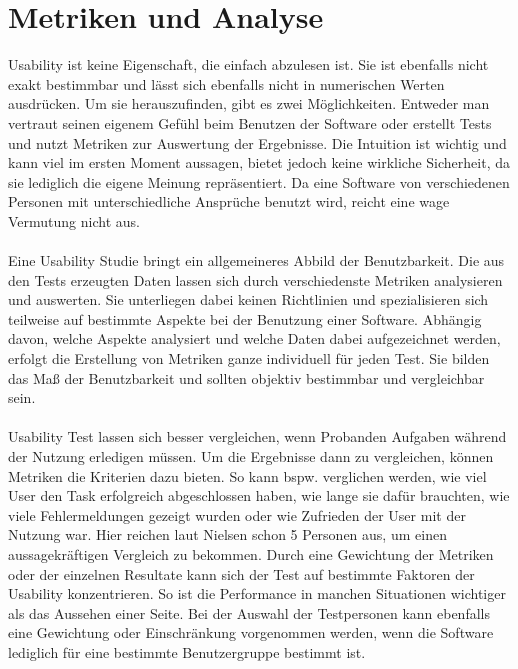 %
%
%
%


\section{Metriken und Analyse}

Usability ist keine Eigenschaft, die einfach abzulesen ist. Sie ist ebenfalls nicht exakt bestimmbar und lässt sich ebenfalls nicht in numerischen Werten ausdrücken. Um sie herauszufinden, gibt es zwei Möglichkeiten. Entweder man vertraut seinen eigenem Gefühl beim Benutzen der Software oder erstellt Tests und nutzt Metriken zur Auswertung der Ergebnisse. Die Intuition ist wichtig und kann viel im ersten Moment aussagen, bietet jedoch keine wirkliche Sicherheit, da sie lediglich die eigene Meinung repräsentiert. Da eine Software von verschiedenen Personen mit unterschiedliche Ansprüche benutzt wird, reicht eine wage Vermutung nicht aus.\\
\\
Eine Usability Studie bringt ein allgemeineres Abbild der Benutzbarkeit. Die aus den Tests erzeugten Daten lassen sich durch verschiedenste Metriken analysieren und auswerten. Sie unterliegen dabei keinen Richtlinien und spezialisieren sich teilweise auf bestimmte Aspekte bei der Benutzung einer Software. Abhängig davon, welche Aspekte analysiert und welche Daten dabei aufgezeichnet werden, erfolgt die Erstellung von Metriken ganze individuell für jeden Test. Sie bilden das Maß der Benutzbarkeit und sollten objektiv bestimmbar und vergleichbar sein.\\
\\
Usability Test lassen sich besser vergleichen, wenn Probanden Aufgaben während der Nutzung erledigen müssen. Um die Ergebnisse dann zu vergleichen, können Metriken die Kriterien dazu bieten. So kann bspw. verglichen werden, wie viel User den Task erfolgreich abgeschlossen haben, wie lange sie dafür brauchten, wie viele Fehlermeldungen gezeigt wurden oder wie Zufrieden der User mit der Nutzung war. Hier reichen laut Nielsen \cite{metrics} schon 5 Personen aus, um einen aussagekräftigen Vergleich zu bekommen. Durch eine Gewichtung der Metriken oder der einzelnen Resultate kann sich der Test auf bestimmte Faktoren der Usability konzentrieren. So ist die Performance in manchen Situationen wichtiger als das Aussehen einer Seite. Bei der Auswahl der Testpersonen kann ebenfalls eine Gewichtung oder Einschränkung vorgenommen werden, wenn die Software lediglich für eine bestimmte Benutzergruppe bestimmt ist.\\
